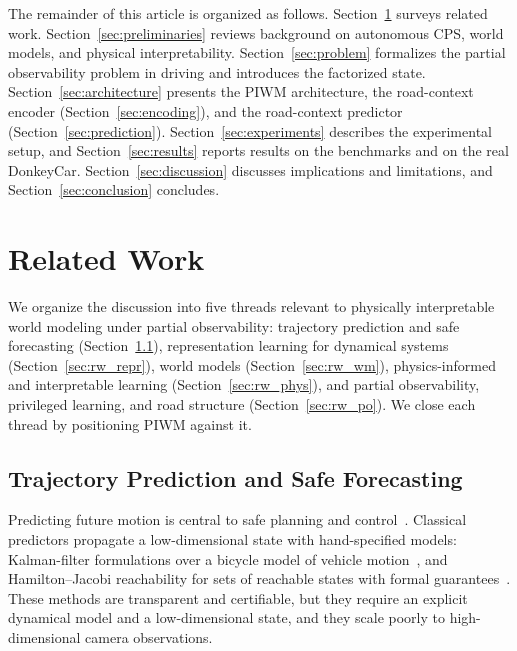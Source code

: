 \documentclass[preprint,12pt]{elsarticle}
\begin{document}
\noindent
The remainder of this article is organized as follows.
Section~\ref{sec:related} surveys related work.
Section~\ref{sec:preliminaries} reviews background on autonomous CPS, world
models, and physical interpretability.
Section~\ref{sec:problem} formalizes the partial observability problem in driving
and introduces the factorized state.
Section~\ref{sec:architecture} presents the PIWM architecture, the road-context
encoder (Section~\ref{sec:encoding}), and the road-context predictor
(Section~\ref{sec:prediction}).
Section~\ref{sec:experiments} describes the experimental setup, and
Section~\ref{sec:results} reports results on the benchmarks and on the real
DonkeyCar.
Section~\ref{sec:discussion} discusses implications and limitations, and
Section~\ref{sec:conclusion} concludes.


\section{Related Work}\label{sec:related}

We organize the discussion into five threads relevant to physically interpretable
world modeling under partial observability: trajectory prediction and safe forecasting
(Section~\ref{sec:rw_traj}), representation learning for dynamical systems
(Section~\ref{sec:rw_repr}), world models (Section~\ref{sec:rw_wm}),
physics-informed and interpretable learning (Section~\ref{sec:rw_phys}), and
partial observability, privileged learning, and road structure
(Section~\ref{sec:rw_po}).
We close each thread by positioning PIWM against it.

\subsection{Trajectory Prediction and Safe Forecasting}\label{sec:rw_traj}

Predicting future motion is central to safe planning and
control~\cite{fridovich2020confidence}.
Classical predictors propagate a low-dimensional state with hand-specified
models: Kalman-filter formulations over a bicycle model of vehicle
motion~\cite{ammoun2009real}, and Hamilton--Jacobi reachability for sets of
reachable states with formal guarantees~\cite{li2021prediction,
nakamura2023online, muthali2023multi}.
These methods are transparent and certifiable, but they require an explicit
dynamical model and a low-dimensional state, and they scale poorly to
high-dimensional camera observations.
\end{document}
